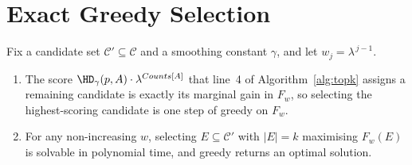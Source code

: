 \section{Exact Greedy Selection}
\label{app:greedy}

\begin{proposition}
\label{prop:greedy-exact}
Fix a candidate set $\mathcal{C}'\subseteq\mathcal{C}$ and a smoothing constant $\gamma$, and let $w_j=\lambda^{\,j-1}$.
\begin{enumerate}[label=(\roman*),leftmargin=*]
\item The score $\HD_\gamma(p,A)\cdot\lambda^{Counts[A]}$ that line~4 of Algorithm~\ref{alg:topk} assigns a remaining candidate is exactly its marginal gain in $F_w$, so selecting the highest-scoring candidate is one step of greedy on $F_w$.
\item For any non-increasing $w$, selecting $E\subseteq\mathcal{C}'$ with $|E|=k$ maximising $F_w(E)$ is solvable in polynomial time, and greedy returns an optimal solution.
\end{enumerate}
\end{proposition}

